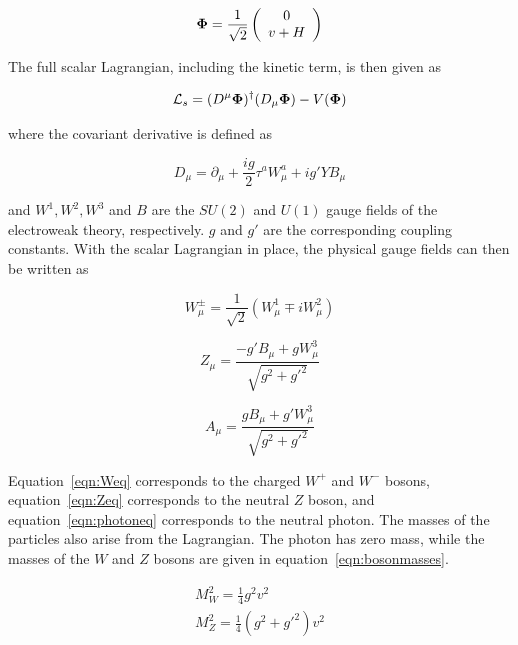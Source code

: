 \begin{equation}
\mathbf{\Phi} = \frac{1}{\sqrt{2}} \left(\begin{array}{c} 0 \\ v + H \end{array}\right)
\end{equation}

The full scalar Lagrangian, including the kinetic term, is then given as 

\begin{equation}
\mathcal{L}_s = (D^\mu \mathbf{\Phi})^\dagger(D_\mu\mathbf{\Phi}) - V(\mathbf{\Phi})
\end{equation}

where the covariant derivative is defined as 

\begin{equation}
D_\mu = \partial_\mu + \frac{ig}{2}\tau^aW_\mu^a + ig'YB_\mu
\end{equation}

and $W^1, W^2, W^3$ and $B$ are the $SU(2)$ and $U(1)$ gauge fields of the electroweak theory, respectively. $g$ and $g'$ are the corresponding coupling constants. With the scalar Lagrangian in place, the physical gauge fields can then be written as 

\begin{equation}
\label{eqn:Weq}
W_\mu^\pm = \frac{1}{\sqrt{2}}(W_\mu^1 \mp iW_\mu^2) 
\end{equation}

\begin{equation}
\label{eqn:Zeq}
Z_\mu = \frac{-g'B_\mu + gW_\mu^3}{\sqrt{g^2 + g'^2}} 
\end{equation}

\begin{equation}
\label{eqn:photoneq}
A_\mu = \frac{gB_\mu + g'W_\mu^3}{\sqrt{g^2 + g'^2}}
\end{equation}

Equation~\ref{eqn:Weq} corresponds to the charged $W^+$ and $W^-$ bosons, equation~\ref{eqn:Zeq} corresponds to the neutral $Z$ boson, and equation~\ref{eqn:photoneq} corresponds to the neutral photon. The masses of the particles also arise from the Lagrangian. The photon has zero mass, while the masses of the $W$ and $Z$ bosons are given in equation~\ref{eqn:bosonmasses}.

\begin{equation}
\label{eqn:bosonmasses}
\begin{array}{c}
M_W^2 = \frac{1}{4}g^2v^2 \\ 
M_Z^2 = \frac{1}{4}(g^2 + g'^2)v^2
\end{array}
\end{equation}

